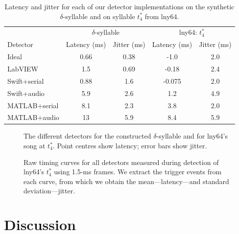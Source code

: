 \documentclass[10pt,letterpaper]{article}
\begin{document}
\begin{table}
  \begin{tabular}{l|c|c|c|c}
    & \multicolumn{2}{c}{$\delta$-syllable} & \multicolumn{2}{c}{lny64: $t^*_4$} \\
    Detector & Latency (ms) & Jitter (ms) & Latency (ms) & Jitter (ms) \\
    \hline
    Ideal & 0.66 & 0.38 & -1.0 & 2.0 \\
    LabVIEW & 1.5 & 0.69 & -0.18 & 2.4 \\
    Swift+serial & 0.88 & 1.6 & -0.075 & 2.0 \\
    Swift+audio & 5.9 & 2.6 & 1.2 & 4.9 \\
    MATLAB+serial & 8.1 & 2.3 & 3.8 & 2.0 \\
    MATLAB+audio & 13 & 5.9 & 8.4 & 5.9
  \end{tabular}
  \caption{Latency and jitter for each of our detector implementations on the synthetic $\delta$-syllable and on syllable $t^*_4$ from lny64.}
  \label{table:TimingVsDetector}
\end{table}

\begin{figure}
  \begin{center}
  \end{center}
  \caption{The different detectors for the constructed
    $\delta$-syllable and for lny64's song at $t^*_4$.  Point centres
    show latency; error bars show jitter.}
  \label{fig:TimingVsDetector}
\end{figure}

\begin{figure}
  \begin{center}
  \end{center}
  \caption{Raw timing curves for all detectors measured during
    detection of lny64's $t^*_4$ using 1.5-ms frames.  We extract the trigger events from each curve, from which we obtain the mean---latency---and
    standard deviation---jitter.}
  \label{fig:timing}
\end{figure}


\section{Discussion}
\label{sec:conclusion}
\end{document}
